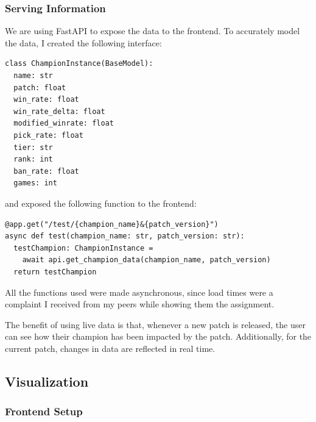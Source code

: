 \documentclass{article}
\begin{document}
\subsubsection{Serving Information} 
\label{subsubsec:Serving Backend Server}

We are using FastAPI to expose the data to the frontend. 
To accurately model the data, I created the following interface:

\begin{lstlisting}[language=Python3]
class ChampionInstance(BaseModel):
  name: str
  patch: float
  win_rate: float
  win_rate_delta: float
  modified_winrate: float
  pick_rate: float
  tier: str
  rank: int
  ban_rate: float
  games: int
\end{lstlisting}

and exposed the following function to the frontend:

\begin{lstlisting}[language=Python3]
@app.get("/test/{champion_name}&{patch_version}")
async def test(champion_name: str, patch_version: str):
  testChampion: ChampionInstance = 
    await api.get_champion_data(champion_name, patch_version)
  return testChampion
\end{lstlisting}

All the functions used were made asynchronous, since load times were a complaint 
I received from my peers while showing them the assignment. 

The benefit of using live data is that, whenever a new patch is released, the user can see how their champion has been impacted by the patch.
Additionally, for the current patch, changes in data are reflected in real time.


\subsection{Visualization}
\label{subsec:Visualization}

\subsubsection{Frontend Setup}
\label{subsubsec:Frontend}
\end{document}
